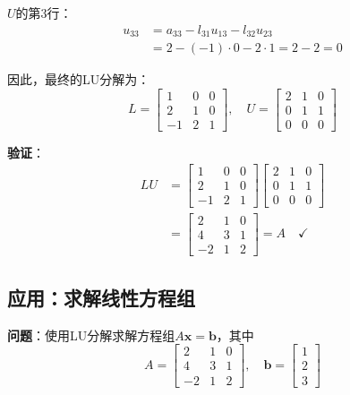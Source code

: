 \documentclass[12pt,a4paper]{article}
\begin{document}
$U$的第3行：
\begin{align}
u_{33} &= a_{33} - l_{31} u_{13} - l_{32} u_{23} \\
&= 2 - (-1) \cdot 0 - 2 \cdot 1 = 2 - 2 = 0
\end{align}

因此，最终的LU分解为：
\begin{equation}
L = \begin{bmatrix} 1 & 0 & 0 \\ 2 & 1 & 0 \\ -1 & 2 & 1 \end{bmatrix}, \quad
U = \begin{bmatrix} 2 & 1 & 0 \\ 0 & 1 & 1 \\ 0 & 0 & 0 \end{bmatrix}
\end{equation}

\textbf{验证}：
\begin{align}
LU &= \begin{bmatrix} 1 & 0 & 0 \\ 2 & 1 & 0 \\ -1 & 2 & 1 \end{bmatrix} \begin{bmatrix} 2 & 1 & 0 \\ 0 & 1 & 1 \\ 0 & 0 & 0 \end{bmatrix} \\
&= \begin{bmatrix} 2 & 1 & 0 \\ 4 & 3 & 1 \\ -2 & 1 & 2 \end{bmatrix} = A \quad \checkmark
\end{align}

\subsection{应用：求解线性方程组}

\textbf{问题}：使用LU分解求解方程组$A\bm{x} = \bm{b}$，其中
\begin{equation}
A = \begin{bmatrix} 2 & 1 & 0 \\ 4 & 3 & 1 \\ -2 & 1 & 2 \end{bmatrix}, \quad
\bm{b} = \begin{bmatrix} 1 \\ 2 \\ 3 \end{bmatrix}
\end{equation}
\end{document}
